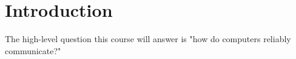 \section{Introduction}

The high-level question this course will answer is "how do computers reliably
communicate?"
